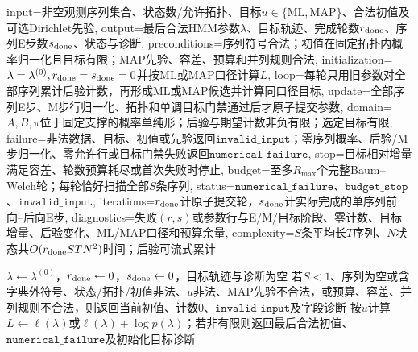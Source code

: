\begin{AlgorithmContract}{
  input={非空观测序列集合、状态数/允许拓扑、目标$u\in\{\mathrm{ML},\mathrm{MAP}\}$、合法初值及可选Dirichlet先验},
  output={最后合法HMM参数$\lambda$、目标轨迹、完成轮数$r_{\rm done}$、序列E步数$s_{\rm done}$、状态与诊断},
  preconditions={序列符号合法；初值在固定拓扑内概率归一化且目标有限；MAP先验、容差、预算和并列规则合法},
  initialization={$\lambda=\lambda^{(0)},r_{\rm done}=s_{\rm done}=0$并按ML或MAP口径计算$L$},
  loop={每轮只用旧参数对全部序列累计后验计数，再形成ML或MAP候选并计算同口径目标},
  update={全部序列E步、M步行归一化、拓扑和单调目标门禁通过后才原子提交参数},
  domain={$A,B,\pi$位于固定支撑的概率单纯形；后验与期望计数非负有限；选定目标有限},
  failure={非法数据、目标、初值或先验返回$\mathtt{invalid\_input}$；零序列概率、后验/M步归一化、零允许行或目标门禁失败返回$\mathtt{numerical\_failure}$},
  stop={目标相对增量满足容差、轮数预算耗尽或首次失败时停止},
  budget={至多$R_{\max}$个完整Baum--Welch轮；每轮恰好扫描全部$S$条序列},
  status={$\mathtt{numerical\_failure}$、$\mathtt{budget\_stop}$、$\mathtt{invalid\_input}$},
  iterations={$r_{\rm done}$计原子提交轮，$s_{\rm done}$计实际完成的单序列前向--后向E步},
  diagnostics={失败$(r,s)$或参数行与E/M/目标阶段、零计数、目标增量、后验变化、ML/MAP口径和预算余量},
  complexity={$S$条平均长$T$序列、$N$状态共$O(r_{\rm done}STN^2)$时间；后验可流式累计}
}
\begin{algorithm}[H]
\SLStudentTallAlgorithmFont
{}
\caption{区分ML与MAP目标的Baum--Welch学习}\label{alg:V3-C05-bw}
$\lambda\leftarrow\lambda^{(0)}$，$r_{\rm done}\leftarrow0$，$s_{\rm done}\leftarrow0$，目标轨迹与诊断为空\;
若$S<1$、序列为空或含字典外符号、状态/拓扑/初值非法、$u$非法、MAP先验不合法，或预算、容差、并列规则不合法，则返回当前初值、计数$0$、$\mathtt{invalid\_input}$及字段诊断\;
按$u$计算$L\leftarrow\ell(\lambda)$或$\ell(\lambda)+\log p(\lambda)$；若非有限则返回最后合法初值、$\mathtt{numerical\_failure}$及初始化目标诊断\;
\end{algorithm}
\end{AlgorithmContract}
